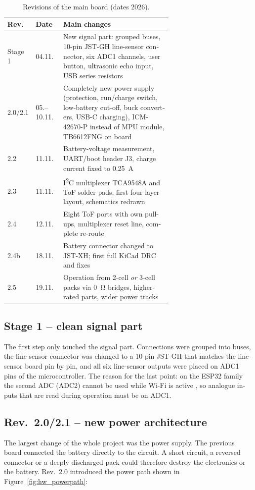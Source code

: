 \begin{otherlanguage}{english}
\begin{table}[htbp]
  \centering\small
  \caption{Revisions of the main board (dates 2026).}
  \label{tab:hw_revisions}
  \begin{tabular}{@{}llp{0.66\linewidth}@{}}
    \toprule
    \textbf{Rev.} & \textbf{Date} & \textbf{Main changes} \\
    \midrule
    Stage 1 & 04.11. & New signal part: grouped buses, 10-pin JST-GH line-sensor connector, six ADC1 channels,
                       user button, ultrasonic echo input, USB series resistors \\
    2.0/2.1 & 05.--10.11. & Completely new power supply (protection, run/charge switch, low-battery cut-off,
                       buck converters, USB-C charging), ICM-42670-P instead of MPU module, TB6612FNG on board \\
    2.2 & 11.11. & Battery-voltage measurement, UART/boot header J3, charge current fixed to \SI{0.25}{\ampere} \\
    2.3 & 11.11. & I\textsuperscript{2}C multiplexer TCA9548A and ToF solder pads, first four-layer layout,
                   schematics redrawn \\
    2.4 & 12.11. & Eight ToF ports with own pull-ups, multiplexer reset line, complete re-route \\
    2.4b & 18.11. & Battery connector changed to JST-XH; first full KiCad DRC and fixes \\
    2.5 & 19.11. & Operation from 2-cell \emph{or} 3-cell packs via \SI{0}{\ohm} bridges, higher-rated parts,
                   wider power tracks \\
    \bottomrule
  \end{tabular}
\end{table}

\subsection{Stage 1 -- clean signal part}
The first step only touched the signal part. Connections were grouped into buses, the line-sensor
connector was changed to a 10-pin JST-GH that matches the line-sensor board pin by pin, and all six
line-sensor outputs were placed on ADC1 pins of the microcontroller. The reason for the last point:
on the ESP32 family the second ADC (ADC2) cannot be used while Wi-Fi is active
\cite{EspressifS3Chip}, so analogue inputs that are read during operation must be on ADC1.

\subsection{Rev.~2.0/2.1 -- new power architecture}
\label{sec:hw_rev20}
The largest change of the whole project was the power supply. The previous board connected the
battery directly to the circuit. A short circuit, a reversed connector or a deeply discharged pack
could therefore destroy the electronics or the battery. Rev.~2.0 introduced the power path shown in
Figure~\ref{fig:hw_powerpath}:


\end{otherlanguage}
